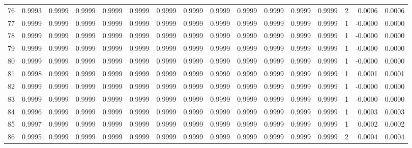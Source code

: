 \begin{tabular}{lrrrrrrrrrrrrrrr}
76  &      0.9993 &  0.9999 &  0.9999 &  0.9999 &  0.9999 &  0.9999 &  0.9999 &  0.9999 &  0.9999 &  0.9999 &   0.9999 &     0.9999 &      2 &                    0.0006 &                     0.0006 \\
77  &      0.9999 &  0.9999 &  0.9999 &  0.9999 &  0.9999 &  0.9999 &  0.9999 &  0.9999 &  0.9999 &  0.9999 &   0.9999 &     0.9999 &      1 &                   -0.0000 &                     0.0000 \\
78  &      0.9999 &  0.9999 &  0.9999 &  0.9999 &  0.9999 &  0.9999 &  0.9999 &  0.9999 &  0.9999 &  0.9999 &   0.9999 &     0.9999 &      1 &                   -0.0000 &                     0.0000 \\
79  &      0.9999 &  0.9999 &  0.9999 &  0.9999 &  0.9999 &  0.9999 &  0.9999 &  0.9999 &  0.9999 &  0.9999 &   0.9999 &     0.9999 &      1 &                   -0.0000 &                     0.0000 \\
80  &      0.9999 &  0.9999 &  0.9999 &  0.9999 &  0.9999 &  0.9999 &  0.9999 &  0.9999 &  0.9999 &  0.9999 &   0.9999 &     0.9999 &      1 &                   -0.0000 &                     0.0000 \\
81  &      0.9998 &  0.9999 &  0.9999 &  0.9999 &  0.9999 &  0.9999 &  0.9999 &  0.9999 &  0.9999 &  0.9999 &   0.9999 &     0.9999 &      1 &                    0.0001 &                     0.0001 \\
82  &      0.9999 &  0.9999 &  0.9999 &  0.9999 &  0.9999 &  0.9999 &  0.9999 &  0.9999 &  0.9999 &  0.9999 &   0.9999 &     0.9999 &      1 &                   -0.0000 &                     0.0000 \\
83  &      0.9999 &  0.9999 &  0.9999 &  0.9999 &  0.9999 &  0.9999 &  0.9999 &  0.9999 &  0.9999 &  0.9999 &   0.9999 &     0.9999 &      1 &                   -0.0000 &                     0.0000 \\
84  &      0.9996 &  0.9999 &  0.9999 &  0.9999 &  0.9999 &  0.9999 &  0.9999 &  0.9999 &  0.9999 &  0.9999 &   0.9999 &     0.9999 &      1 &                    0.0003 &                     0.0003 \\
85  &      0.9997 &  0.9999 &  0.9999 &  0.9999 &  0.9999 &  0.9999 &  0.9999 &  0.9999 &  0.9999 &  0.9999 &   0.9999 &     0.9999 &      1 &                    0.0002 &                     0.0002 \\
86  &      0.9995 &  0.9999 &  0.9999 &  0.9999 &  0.9999 &  0.9999 &  0.9999 &  0.9999 &  0.9999 &  0.9999 &   0.9999 &     0.9999 &      2 &                    0.0004 &                     0.0004 \\

\end{tabular}
